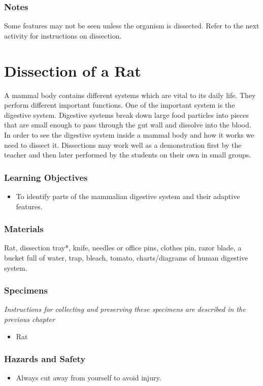 \subsubsection*{Notes}
Some features may not be seen unless the organism is dissected.  Refer to the next activity for instructions on dissection.


\section{Dissection of a Rat}
A mammal body contains different systems which are vital to its daily life. They perform different important functions. One of the important system is the digestive system. Digestive systems break down large food particles into pieces that are small enough to pass through the gut wall and dissolve into the blood. In order to see the digestive system inside a mammal body and how it works we need to dissect it.
Dissections may work well as a demonstration first by the teacher and then later performed by the students on their own in small groups.

\subsubsection*{Learning Objectives}
\begin{itemize}
\item{To identify parts of the mammalian digestive system and their adaptive features.}
\end{itemize}

\subsubsection*{Materials}
Rat, dissection tray*, knife, needles or office pins, clothes pin, razor blade, a bucket full of water, trap, bleach, tomato, charts/diagrams of human digestive system.

\subsubsection*{Specimens}
\textit{Instructions for collecting and preserving these specimens are described in the previous chapter}
\begin{itemize}
\item{Rat}
\end{itemize}

\subsubsection*{Hazards and Safety}
\begin{itemize}
\item{Always cut away from yourself to avoid injury.}
\end{itemize}

